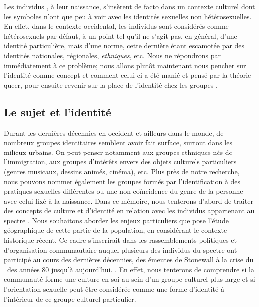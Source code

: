 Les individus \lgbt{}, à leur naissance, s'insèrent de facto dans un contexte culturel dont les symboles n'ont que peu à voir avec les identités sexuelles non hétérosexuelles. 
En effet, dans le contexte occidental, les individus sont considérés comme hétérosexuels par défaut, à un point tel qu'il ne s'agit pas, en général, d'une identité particulière, mais d'une norme, cette dernière étant escamotée par des identités nationales, régionales, \emph{ethniques}, etc.
Nous ne répondrons par immédiatement à ce problème; nous allons plutôt maintenant nous pencher sur l'identité comme concept et comment celui-ci a été manié et pensé par la théorie queer, pour ensuite revenir sur la place de l'identité chez les groupes \lgbt{}.

\subsection{Le sujet et l'identité}
\label{subsec:sujet_et_identité} Durant les dernières décennies en occident et ailleurs dans le monde, de nombreux groupes identitaires semblent avoir fait surface, surtout dans les milieux urbains. 
On peut penser notamment aux groupes ethniques nés de l'immigration, aux groupes d'intérêts envers des objets culturels particuliers (genres musicaux, dessins animés, cinéma), etc. 
Plus près de notre recherche, nous pouvons nommer également les groupes formés par l'identification à des pratiques sexuelles différentes ou une non-coïncidence du genre de la personne avec celui fixé à la naissance. 
Dans ce mémoire, nous tenterons d'abord de traiter des concepts de culture et d'identité en relation avec les individus appartenant au spectre \lgbt{} . 
Nous souhaitons aborder les enjeux particuliers que pose l'étude géographique de cette partie de la population, en considérant le contexte historique récent. 
Ce cadre s'inscrirait dans les rassemblements politiques et d'organisation communautaire auquel plusieurs des individus du spectre \lgbt{} ont participé au cours des dernières décennies, des émeutes de Stonewall à la crise du \sida\ des années 80 jusqu'à aujourd'hui.
. 
En effet, nous tenterons de comprendre si la communauté \lgbt{} forme une culture en soi au sein d'un groupe culturel plus large et si l'orientation sexuelle peut être considérée comme une forme d'identité à l'intérieur de ce groupe culturel particulier. 

